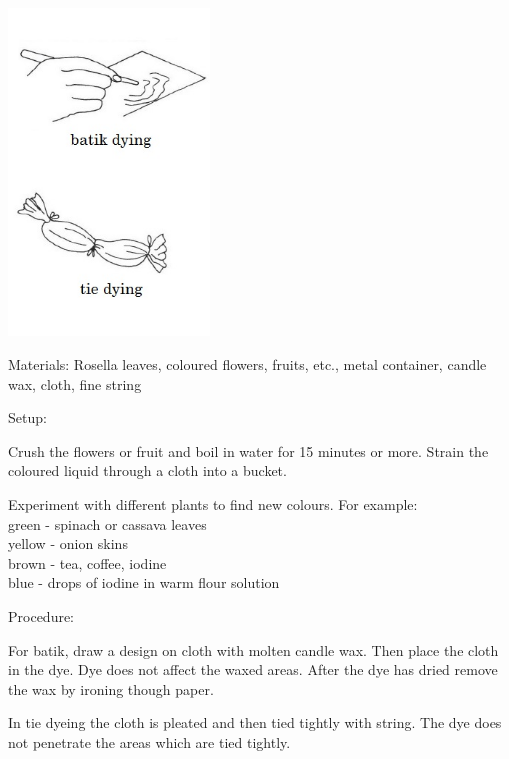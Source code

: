 \begin{multicols}{2}
\begin{center}
\includegraphics[width=0.4\textwidth]{./img/vso/tie-dyeing.jpg}
\end{center}

\begin{description*}
\item[Materials:]{Rosella leaves, coloured flowers, fruits, etc., metal container, candle wax, cloth, fine string}
\item[Setup:]{Crush the flowers or fruit and boil in water for 15 minutes or more. Strain the coloured liquid through a cloth into a bucket.

Experiment with different plants to find new colours. For example:\\
green - spinach or cassava leaves\\
yellow - onion skins\\
brown - tea, coffee, iodine\\
blue - drops of iodine in warm flour solution}
\item[Procedure:]{For batik, draw a design on cloth with molten candle wax. Then place the cloth in the dye. Dye does not affect the waxed areas. After the dye has dried remove the wax by ironing though paper.

In tie dyeing the cloth is pleated and then tied tightly with string. The dye does not penetrate the areas which are tied tightly.}
\end{description*}



\end{multicols}

\pagebreak